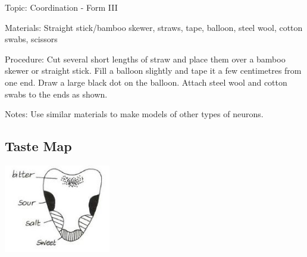 \begin{multicols}{2}
\begin{description*}
\item[Topic:]{Coordination - Form III}
\item[Materials:]{Straight stick/bamboo skewer, straws, tape, balloon, steel wool, cotton swabs, scissors}
\item[Procedure:]{Cut several short lengths of straw and place them over a bamboo skewer or straight stick. Fill a balloon slightly and tape it a few centimetres from one end. Draw a large black dot on the balloon. Attach steel wool and cotton swabs to the ends as shown.}
\item[Notes:]{Use similar materials to make models of other types of neurons.}
\end{description*}

\subsection{Taste Map}

\begin{center}
\includegraphics[width=0.35\textwidth]{./img/vso/taste-map.jpg}
\end{center}


\end{multicols}

